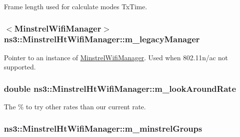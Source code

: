 Frame length used for calculate modes Tx\+Time. 

\subsubsection[{\texorpdfstring{m\+\_\+legacy\+Manager}{m_legacyManager}}]{$<${\bf Minstrel\+Wifi\+Manager}$>$ ns3\+::\+Minstrel\+Ht\+Wifi\+Manager\+::m\+\_\+legacy\+Manager\hspace{0.3cm}{\ttfamily [private]}}\hypertarget{classns3_1_1MinstrelHtWifiManager_ae10ffd948e46a60593b1aef80372082a}{}\label{classns3_1_1MinstrelHtWifiManager_ae10ffd948e46a60593b1aef80372082a}


Pointer to an instance of \hyperlink{classns3_1_1MinstrelWifiManager}{Minstrel\+Wifi\+Manager}. Used when 802.\+11n/ac not supported. 

\subsubsection[{\texorpdfstring{m\+\_\+look\+Around\+Rate}{m_lookAroundRate}}]{\setlength{\rightskip}{0pt plus 5cm}double ns3\+::\+Minstrel\+Ht\+Wifi\+Manager\+::m\+\_\+look\+Around\+Rate\hspace{0.3cm}{\ttfamily [private]}}\hypertarget{classns3_1_1MinstrelHtWifiManager_a7db397626b2dff4bd62619aa7fec75af}{}\label{classns3_1_1MinstrelHtWifiManager_a7db397626b2dff4bd62619aa7fec75af}


The \% to try other rates than our current rate. 

\subsubsection[{\texorpdfstring{m\+\_\+minstrel\+Groups}{m_minstrelGroups}}]{ ns3\+::\+Minstrel\+Ht\+Wifi\+Manager\+::m\+\_\+minstrel\+Groups\hspace{0.3cm}{\ttfamily [private]}}\hypertarget{classns3_1_1MinstrelHtWifiManager_a231741ce3f38417925019aa598570468}{}\label{classns3_1_1MinstrelHtWifiManager_a231741ce3f38417925019aa598570468}


